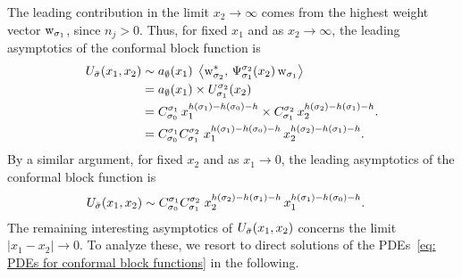 \documentclass[oneside,english]{amsart}
\numberwithin{equation}{section}
\numberwithin{figure}{section}
\theoremstyle{plain}
\theoremstyle{plain}
\theoremstyle{plain}
\theoremstyle{remark}
\theoremstyle{plain}
\theoremstyle{plain}
\theoremstyle{plain}
\theoremstyle{plain}
\theoremstyle{plain}
\theoremstyle{plain}
\theoremstyle{plain}
\theoremstyle{plain}
\newcommand{\blue}[1]{{\color{blue} #1}}
\newcommand{\green}[1]{{\color{green} #1}}
\begin{document}
The leading contribution
in the limit $x_{2}\to\infty$ 
comes from the highest weight vector $\mathrm{w}_{\sigma_1}$, since $n_j>0$.
Thus, for fixed $x_{1}$ and as $x_{2}\to\infty$, %
the leading asymptotics of the conformal block function is
\begin{align}
\begin{split}
U_{\bar{\sigma}}(x_{1},x_{2})
    \sim\; & a_{\emptyset}(x_{1})\;\left\langle  \mathrm{w}_{\sigma_{2}}^{*} , \, \Psi_{\sigma_{1}}^{\sigma_{2}}(x_{2})\,\mathrm{w}_{\sigma_{1}}  \right\rangle \\
    =\; & a_{\emptyset}(x_{1})\times U_{\sigma_{1}}^{\sigma_{2}}(x_{2}) \\
    =\; & C_{\sigma_{0}}^{\sigma_{1}}\,x_{1}^{h(\sigma_{1})-h(\sigma_{0})-h}\times C_{\sigma_{1}}^{\sigma_{2}}\,x_{2}^{h(\sigma_{2})-h(\sigma_{1})-h}. \\
    =\; & C_{\sigma_{0}}^{\sigma_{1}}C_{\sigma_{1}}^{\sigma_{2}}\;x_{1}^{h(\sigma_{1})-h(\sigma_{0})-h}\,x_{2}^{h(\sigma_{2})-h(\sigma_{1})-h}.
    \label{eq: asymptotics for x2}
\end{split}
\end{align}
By a similar argument, for fixed $x_{2}$ and as $x_{1}\to0$,
the leading asymptotics of the conformal block function is
\begin{align} \label{eq: asymptotics for x1}
U_{\bar{\sigma}}(x_{1},x_{2})\sim\; & C_{\sigma_{0}}^{\sigma_{1}}C_{\sigma_{1}}^{\sigma_{2}}\;x_{2}^{h(\sigma_{2})-h(\sigma_{1})-h}\,x_{1}^{h(\sigma_{1})-h(\sigma_{0})-h}.
\end{align}
The remaining interesting asymptotics of $U_{\bar{\sigma}}(x_{1},x_{2})$
concerns the limit $|x_{1}-x_{2}|\to0$.
To analyze these, we resort to direct solutions of the PDEs~\eqref{eq: PDEs for conformal block functions} in the following.
\end{document}

